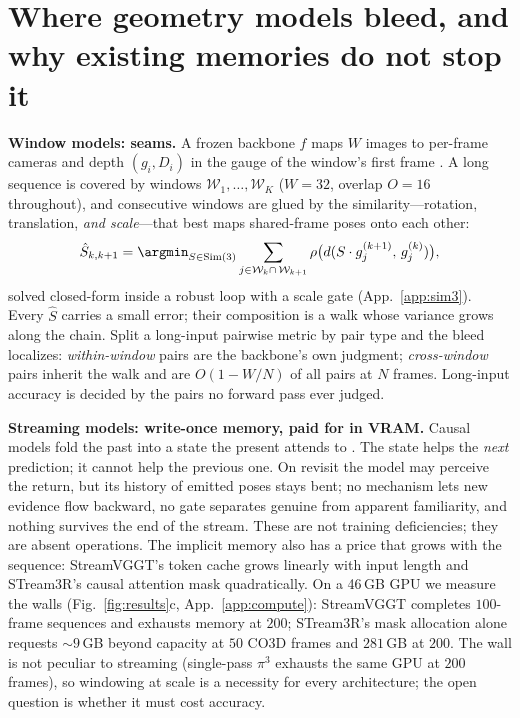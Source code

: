 \documentclass{article}
\providecommand{\cW}{\mathcal{W}}
\newcommand{\simthree}{\mathrm{Sim}(3)}
\begin{document}
\section{Where geometry models bleed, and why existing memories do not stop it}
\label{sec:bleed}
\textbf{Window models: seams.} A frozen backbone $f$ maps $W$ images to
per-frame cameras and depth $(g_i,D_i)$ in the gauge of the window's first
frame \citep{vggt}. A long sequence is covered by windows
$\cW_1,\dots,\cW_K$ ($W{=}32$, overlap $O{=}16$ throughout), and consecutive
windows are glued by the similarity---rotation, translation, \emph{and
scale}---that best maps shared-frame poses onto each other:
\begin{equation}
\label{eq:junction}
\hat S_{k,k+1}=\argmin_{S\in\simthree}
\sum_{j\in\cW_k\cap\,\cW_{k+1}}\rho\big(d(S\cdot g_j^{(k+1)},\,g_j^{(k)})\big),
\end{equation}
solved closed-form \citep{umeyama,horn} inside a robust loop with a scale
gate (App.~\ref{app:sim3}). Every $\hat S$ carries a small error; their
composition is a walk whose variance grows along the chain. Split a long-input pairwise metric by pair type and the bleed localizes:
\emph{within-window} pairs are the backbone's own judgment; \emph{cross-window}
pairs inherit the walk and are $O(1{-}W/N)$ of all pairs at $N$ frames.
Long-input accuracy is decided by the pairs no forward pass ever judged.

\textbf{Streaming models: write-once memory, paid for in VRAM.} Causal
models fold the past into a state the present attends to
\citep{cut3r,streamvggt,stream3r}. The state helps the \emph{next}
prediction; it cannot help the previous one. On revisit the model may
perceive the return, but its history of emitted poses stays bent; no
mechanism lets new evidence flow backward, no gate separates genuine from
apparent familiarity, and nothing survives the end of the stream. These are
not training deficiencies; they are absent operations. The implicit memory
also has a price that grows with the sequence: StreamVGGT's token cache grows
linearly with input length and STream3R's causal attention mask
quadratically. On a 46\,GB GPU we measure the walls (Fig.~\ref{fig:results}c,
App.~\ref{app:compute}): StreamVGGT completes $100$-frame sequences and
exhausts memory at $200$; STream3R's mask allocation alone requests
${\sim}9$\,GB beyond capacity at $50$ CO3D frames and $281$\,GB at $200$.
The wall is not peculiar to streaming (single-pass $\pi^3$ exhausts the same
GPU at $200$ frames), so windowing at scale is a necessity for every
architecture; the open question is whether it must cost accuracy.
\end{document}
